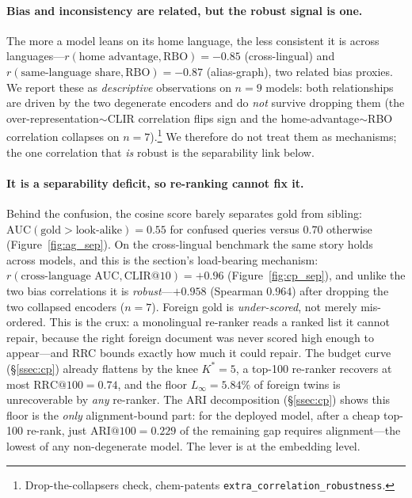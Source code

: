 \documentclass[11pt]{article}
\begin{document}
\paragraph{Bias and inconsistency are related, but the robust signal is one.}
The more a model leans on its home language, the less consistent it is across
languages---$r(\text{home advantage},\text{RBO})=-0.85$ (cross-lingual) and
$r(\text{same-language share},\text{RBO})=-0.87$ (alias-graph), two related bias
proxies. We report these as \emph{descriptive} observations on $n{=}9$ models:
both relationships are driven by the two degenerate encoders and do \emph{not}
survive dropping them (the over-representation$\sim$CLIR correlation flips sign
and the home-advantage$\sim$RBO correlation collapses on $n{=}7$).\footnote{Drop-the-collapsers
check, chem-patents \texttt{extra\_correlation\_robustness}.} We therefore do not
treat them as mechanisms; the one correlation that \emph{is} robust is the
separability link below.

\paragraph{It is a separability deficit, so re-ranking cannot fix it.}
Behind the confusion, the cosine score barely separates gold from sibling:
$\mathrm{AUC}(\text{gold}>\text{look-alike})=0.55$ for confused queries versus
$0.70$ otherwise (Figure~\ref{fig:ag_sep}). On the cross-lingual benchmark the
same story holds across models, and this is the section's load-bearing
mechanism: $r(\text{cross-language AUC},\text{CLIR@10})=+0.96$
(Figure~\ref{fig:cp_sep}), and unlike the two bias correlations it is
\emph{robust}---$+0.958$ (Spearman $0.964$) after dropping the two collapsed
encoders ($n{=}7$). Foreign gold is \emph{under-scored}, not merely mis-ordered.
This is the crux: a monolingual re-ranker reads a ranked list it cannot repair,
because the right foreign document was never scored high enough to appear---and
RRC bounds exactly how much it could repair. The budget curve (\S\ref{ssec:cp})
already flattens by the knee $K^{\!*}{=}5$, a top-100 re-ranker recovers at most
$\mathrm{RRC@}100=0.74$, and the floor $L_\infty=5.84\%$ of foreign twins is
unrecoverable by \emph{any} re-ranker. The ARI decomposition (\S\ref{ssec:cp})
shows this floor is the \emph{only} alignment-bound part: for the deployed model,
after a cheap top-100 re-rank, just $\mathrm{ARI@}100=0.229$ of the remaining gap
requires alignment---the lowest of any non-degenerate model. The lever is at the
embedding level.
\end{document}
